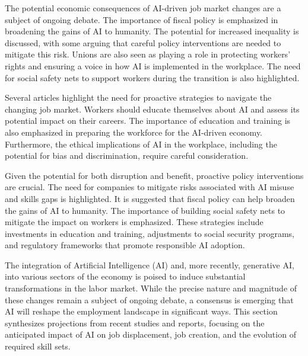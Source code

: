 \documentclass[a4paper,headinclude=on,footinclude=on,12pt,oneside]{scrbook}
\begin{document}

The potential economic consequences of AI-driven job market changes are a subject of ongoing debate. The importance of fiscal policy is emphasized in broadening the gains of AI to humanity. The potential for increased inequality is discussed, with some arguing that careful policy interventions are needed to mitigate this risk. Unions are also seen as playing a role in protecting workers’ rights and ensuring a voice in how AI is implemented in the workplace. The need for social safety nets to support workers during the transition is also highlighted.


Several articles highlight the need for proactive strategies to navigate the changing job market. Workers should educate themselves about AI and assess its potential impact on their careers. The importance of education and training is also emphasized in preparing the workforce for the AI-driven economy. Furthermore, the ethical implications of AI in the workplace, including the potential for bias and discrimination, require careful consideration.


Given the potential for both disruption and benefit, proactive policy interventions are crucial. The need for companies to mitigate risks associated with AI misuse and skills gaps is highlighted. It is suggested that fiscal policy can help broaden the gains of AI to humanity. The importance of building social safety nets to mitigate the impact on workers is emphasized. These strategies include investments in education and training, adjustments to social security programs, and regulatory frameworks that promote responsible AI adoption.


The integration of Artificial Intelligence (AI) and, more recently, generative AI, into various sectors of the economy is poised to induce substantial transformations in the labor market. While the precise nature and magnitude of these changes remain a subject of ongoing debate, a consensus is emerging that AI will reshape the employment landscape in significant ways. This section synthesizes projections from recent studies and reports, focusing on the anticipated impact of AI on job displacement, job creation, and the evolution of required skill sets.
\end{document}
